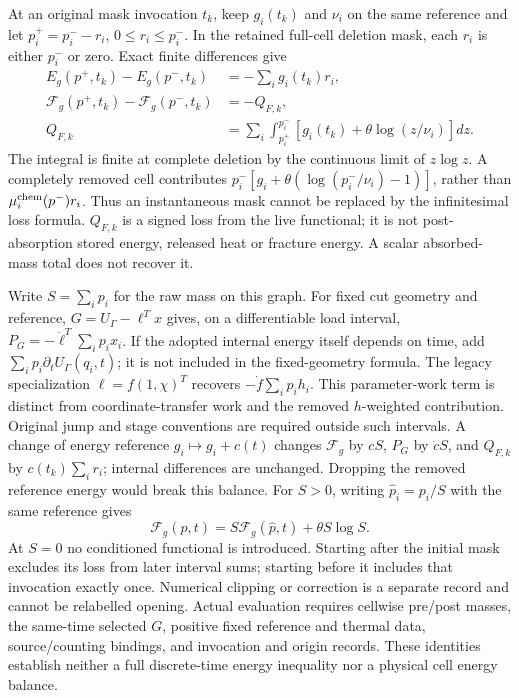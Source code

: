 \documentclass[11pt]{article}
\begin{document}
At an original mask invocation $t_k$, keep $g_i(t_k)$ and $\nu_i$ on the same
reference and let $p_i^+=p_i^- -r_i$, $0\leq r_i\leq p_i^-$. In the retained
full-cell deletion mask, each $r_i$ is either $p_i^-$ or zero. Exact finite
differences give
\begin{align}
 E_g(p^+,t_k)-E_g(p^-,t_k)&=-\sum_i g_i(t_k)r_i,\nonumber\\
 \mathcal F_g(p^+,t_k)-\mathcal F_g(p^-,t_k)&=-Q_{F,k},\nonumber\\
 Q_{F,k}&=\sum_i\int_{p_i^+}^{p_i^-}
    \left[g_i(t_k)+\theta\log(z/\nu_i)\right]dz .
 \label{eq:r09-finite-mask}
\end{align}
The integral is finite at complete deletion by the continuous limit of
$z\log z$. A completely removed cell contributes
$p_i^-[g_i+\theta(\log(p_i^-/\nu_i)-1)]$, rather than
$\mu_i^{\rm chem}(p^-)r_i$. Thus an instantaneous mask cannot be replaced
by the infinitesimal loss formula. $Q_{F,k}$ is a signed loss from the live
functional; it is not post-absorption stored energy, released heat or
fracture energy. A scalar absorbed-mass total does not recover it.

Write $S=\sum_i p_i$ for the raw mass on this graph. For fixed cut geometry
and reference, $G=U_\Gamma-\ell^Tx$ gives, on a differentiable load interval,
$P_G=-\dot\ell^T\sum_i p_i x_i$. If the adopted internal energy itself
depends on time, add $\sum_i p_i\partial_t U_\Gamma(q_i,t)$; it is not
included in the fixed-geometry formula. The legacy specialization
$\ell=f(1,\chi)^T$ recovers $-\dot f\sum_i p_i h_i$. This parameter-work term is distinct from
coordinate-transfer work and the removed $h$-weighted contribution. Original
jump and stage conventions are required outside such intervals. A change of
energy reference $g_i\mapsto g_i+c(t)$ changes $\mathcal F_g$ by $cS$,
$P_G$ by $\dot cS$, and $Q_{F,k}$ by $c(t_k)\sum_i r_i$; internal differences
are unchanged. Dropping the removed reference energy would break this balance.
For $S>0$, writing $\widehat p_i=p_i/S$ with the same reference gives
\begin{equation}
 \mathcal F_g(p,t)=S\mathcal F_g(\widehat p,t)+\theta S\log S .
 \label{eq:r09-conditioned-functional}
\end{equation}
At $S=0$ no conditioned functional is introduced. Starting after the initial
mask excludes its loss from later interval sums; starting before it includes
that invocation exactly once. Numerical clipping or correction is a separate
record and cannot be relabelled opening. Actual evaluation requires cellwise
pre/post masses, the same-time selected $G$, positive fixed reference and
thermal data, source/counting bindings, and invocation and origin records.
These identities establish neither a full discrete-time energy inequality
nor a physical cell energy balance.
\end{document}
